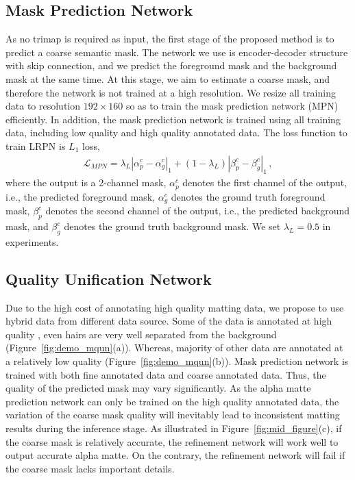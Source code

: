 \documentclass[10pt,twocolumn,letterpaper]{article}
\begin{document}
\subsection{Mask Prediction Network}
As no trimap is required as input, the first stage of the proposed method is to predict a coarse semantic mask. The network we use is encoder-decoder structure with skip connection, and we predict the foreground mask and the background mask at the same time. At this stage, we aim to estimate a coarse mask, and therefore the network is not trained at a high resolution. We resize all training data to resolution $192\times 160$ so as to train the mask prediction network (MPN) efficiently. In addition, the mask prediction network is trained using all training data, including low quality and high quality annotated data. The loss function to train LRPN is $L_1$ loss,
\begin{equation}
\begin{aligned}
\label{eq:l1_loss}
\mathcal{L}_{MPN}=\lambda_L|\alpha^c_p-\alpha^c_g|_1+(1-\lambda_L)|\beta^c_p-\beta_g^c|_1\,,
\end{aligned}
\end{equation}
where the output is a 2-channel mask, $\alpha^c_p$ denotes the first channel of the output, i.e., the predicted foreground mask, $\alpha^c_g$ denotes the ground truth foreground mask, $\beta^c_p$ denotes the second channel of the output, i.e., the predicted background mask, and $\beta_g^c$ denotes the ground truth background mask. We set $\lambda_L=0.5$ in experiments.


\subsection{Quality Unification Network}
Due to the high cost of annotating high quality matting data, we propose to use hybrid data from different data source. Some of the data is annotated at high quality , even hairs are very well separated from the background (Figure~\ref{fig:demo_mqun}(a)). Whereas, majority of other data are annotated at a relatively low quality (Figure~\ref{fig:demo_mqun}(b)). Mask prediction network is trained with both fine annotated data and coarse annotated data. Thus, the quality of the predicted mask may vary significantly. As the alpha matte prediction network can only be trained on the high quality annotated data, the variation of the coarse mask quality will inevitably lead to inconsistent matting results during the inference stage. As illustrated in Figure~\ref{fig:mid_figure}(c), if the coarse mask is relatively accurate, the refinement network will work well to output accurate alpha matte. On the contrary, the refinement network will fail if the coarse mask lacks important details.
\end{document}
